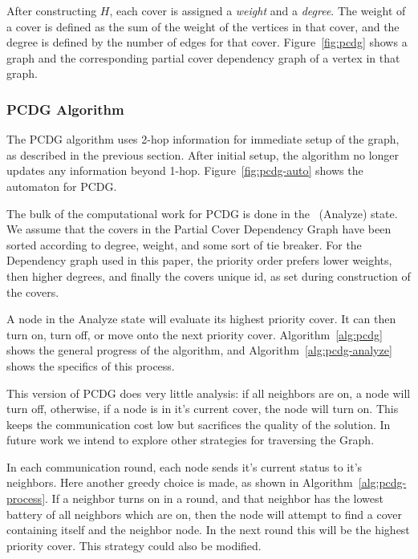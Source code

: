 After constructing $H$, each cover is assigned a {\em weight} and a {\em degree}. The weight of a cover is defined as the sum of the weight of the vertices in that cover, and the degree is defined by the number of edges for that cover. Figure~\ref{fig:pcdg} shows a graph and the corresponding partial cover dependency graph of a vertex in that graph.



\subsubsection{PCDG Algorithm}
\label{sec:pcdg-alg}

The PCDG algorithm uses 2-hop information for immediate setup of the graph, as described in the previous section. After initial setup, the algorithm no longer updates any information beyond 1-hop. Figure~\ref{fig:pcdg-auto} shows the automaton for PCDG.



The bulk of the computational work for PCDG is done in the \cAd\ (Analyze) state. We assume that the covers in the Partial Cover Dependency Graph have been sorted according to degree, weight, and some sort of tie breaker. For the Dependency graph used in this paper, the priority order prefers lower weights, then higher degrees, and finally the covers unique id, as set during construction of the covers.

A node in the Analyze state will evaluate its highest priority cover. It can then turn on, turn off, or move onto the next priority cover. Algorithm~\ref{alg:pcdg} shows the general progress of the algorithm, and Algorithm~\ref{alg:pcdg-analyze} shows the specifics of this process.

This version of PCDG does very little analysis: if all neighbors are on, a node will turn off, otherwise, if a node is in it's current cover, the node will turn on. This keeps the communication cost low but sacrifices the quality of the solution. In future work we intend to explore other strategies for traversing the Graph.

In each communication round, each node sends it's current status to it's neighbors. Here another greedy choice is made, as shown in Algorithm~\ref{alg:pcdg-process}. If a neighbor turns on in a round, and that neighbor has the lowest battery of all neighbors which are on, then the node will attempt to find a cover containing itself and the neighbor node. In the next round this will be the highest priority cover. This strategy could also be modified. 

